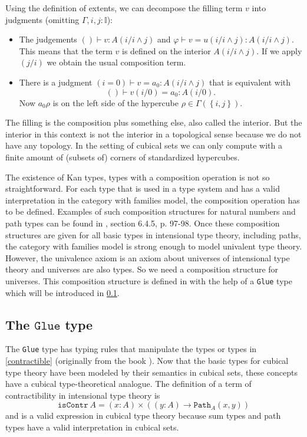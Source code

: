 \documentclass[12pt,a4paper,twoside,xetex]{book}
\newcommand{\op}[1]{\mathtt{#1}}
\newcommand{\pa}[3]{\op{Path}_{#1}\left(#2, #3\right)}
\begin{document}
Using the definition of extents, we can decompose the filling term $v$ into judgments (omitting $\Gamma, i,j : \mathbb{I}$):

\begin{itemize}

\item The judgements $()\vdash v : A(i/i \wedge j)$ and $\varphi \vdash v = u(i/i \wedge j) : A(i/i \wedge j)$. 
This means that the term $v$ is defined on the interior $A(i/i \wedge j)$. 
If we apply $(j/i)$ we obtain the usual composition term.

\item There is a judgment $(i = 0) \vdash v = a_0 : A(i/i \wedge j)$ that is equivalent with $$() \vdash v(i/0) = a_0 : A(i/0).$$
Now $a_0\rho$ is on the left side of the hypercube $\rho \in \Gamma \left( \left\{i,j\right\} \right)$.

\end{itemize}

The filling is the composition plus something else, also called the interior. But the interior in this context is not the interior in a topological sense because we do not have any topology. In the setting of cubical sets we can only compute with a finite amount of (subsets of) corners of standardized hypercubes.

The existence of Kan types, types with a composition operation is not so straightforward. For each type that is used in a type system and has a valid interpretation in the category with families model, the composition operation has to be defined. Examples of such composition structures for natural numbers and path types can be found in \cite{Huber2016}, section 6.4.5, p. 97-98. Once these composition structures are given for all basic types in intensional type theory, including paths, the category with families model is strong enough to model univalent type theory. However, the univalence axiom is an axiom about universes of intensional type theory and universes are also types. So we need a composition structure for universes. This composition structure is defined in \cite{Huber2016} with the help of a \texttt{Glue} type which will be introduced in \cref{glueOp}. 



\subsection{The $\op{Glue}$ type}\label{glueOp}

The \texttt{Glue} type has typing rules that manipulate the types or types in \cref{contractible} (originally from the book \cite{Voevodsky2013}). Now that the basic types for cubical type theory have been modeled by their semantics in cubical sets, these concepts  have a cubical type-theoretical analogue. The definition of a term of contractibility in intensional type theory is $$\op{isContr} \ A = (x:A) \times \left( (y:A) \rightarrow \pa{A}{x}{y} \right)$$ and is a valid expression in cubical type theory because sum types and path types have a valid interpretation in cubical sets.
\end{document}
